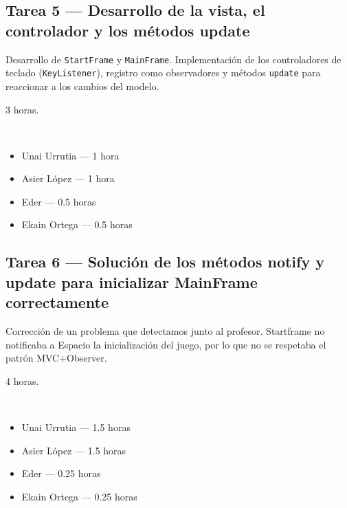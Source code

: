 \documentclass[12pt, a4paper]{article}
\begin{document}
\vspace{0.8em}

\subsection*{Tarea 5 — Desarrollo de la vista, el controlador y los métodos update}
\begin{description}[leftmargin=2em, style=nextline]
    \item[\textbf{Descripción:}] Desarrollo de \texttt{StartFrame} y \texttt{MainFrame}. Implementación de los controladores de teclado (\texttt{KeyListener}), registro como observadores y métodos \texttt{update} para reaccionar a los cambios del modelo.
    \item[\textbf{Tiempo:}] 3 horas.
    \item[\textbf{Responsables y dedicación:}]~
        \begin{itemize}[leftmargin=1em, nosep]
            \item Unai Urrutia — 1 hora
            \item Asier López — 1 hora
            \item Eder — 0.5 horas
            \item Ekain Ortega — 0.5 horas
        \end{itemize}
\end{description}

\vspace{0.8em}

\subsection*{Tarea 6 — Solución de los métodos notify y update para inicializar MainFrame correctamente}
\begin{description}[leftmargin=2em, style=nextline]
    \item[\textbf{Descripción:}] Corrección de un problema que detectamos junto al profesor. Startframe no notificaba a Espacio la inicialización del juego, por lo que no se respetaba el patrón MVC+Observer.
    \item[\textbf{Tiempo:}] 4 horas.
    \item[\textbf{Responsables y dedicación:}]~
        \begin{itemize}[leftmargin=1em, nosep]
            \item Unai Urrutia — 1.5 horas
            \item Asier López — 1.5 horas
            \item Eder — 0.25 horas
            \item Ekain Ortega — 0.25 horas
        \end{itemize}
\end{description}
\end{document}
